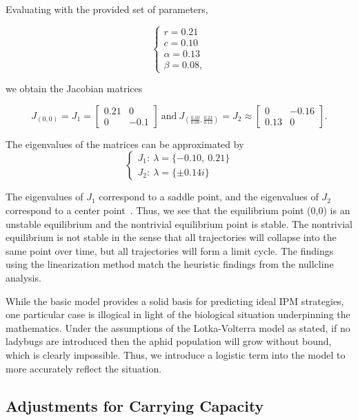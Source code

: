 \documentclass[10pt]{article}
\begin{document}
Evaluating with the provided set of parameters,

\[ \begin{cases}
r = 0.21 \\
c = 0.10 \\
\alpha =0.13  \\
\beta = 0.08,
\end{cases} 
\]

we obtain the Jacobian matrices

\[ J_{(0,0)} = J_1 =  
\begin{bmatrix}
0.21 & 0 \\[1ex]
0 & -0.1
\end{bmatrix} \
\mathrm{ and } \
J_{\left( \frac{0.10}{0.08},\frac{0.21}{0.13} \right)} = J_2 \approx
\begin{bmatrix}
 0 & -0.16 \\[1ex]
 0.13 & 0
\end{bmatrix}. \]

The eigenvalues of the matrices can be approximated by
\[
\begin{cases}
J_1: \ \lambda = \{-0.10, \ 0.21\} \\
J_2: \ \lambda = \{\pm 0.14i\}
\end{cases}
\]

The eigenvalues of \(J_1\) correspond to a saddle point, and the eigenvalues of \(J_2\) correspond to a center point~\cite{TDplane}. Thus, we see that the equilibrium point (0,0) is an unstable equilibrium and the nontrivial equilibrium point is stable. The nontrivial equilibrium is not stable in the sense that all trajectories will collapse into the same point over time, but all trajectories will form a limit cycle. The findings using the linearization method match the heuristic findings from the nullcline analysis.

While the basic model provides a solid basis for predicting ideal IPM strategies, one particular case is illogical in light of the biological situation underpinning the mathematics. Under the assumptions of the Lotka-Volterra model as stated, if no ladybugs are introduced then the aphid population will grow without bound, which is clearly impossible. Thus, we introduce a logistic term into the model to more accurately reflect the situation.

\subsection{Adjustments for Carrying Capacity}
\end{document}
